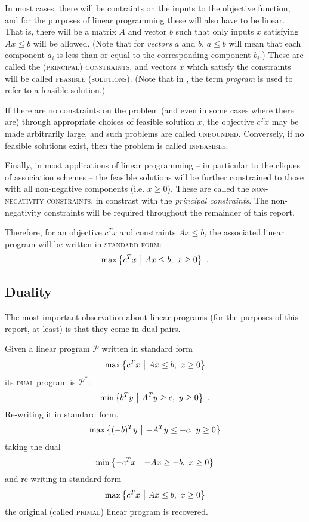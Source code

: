 \documentclass{report}
\begin{document}
    In most cases, there will be contraints on the inputs to the objective
    function, and for the purposes of linear programming these will also have
    to be linear.
    That is, there will be a matrix $A$ and vector $b$
    such that only inputs $x$ satisfying $Ax \leq b$ will be allowed.
    (Note that for \textit{vectors} $a$ and $b$,
    $a \leq b$ will mean that each component $a_i$
    is less than or equal to the corresponding component $b_i$.)
    These are called the \textsc{(principal) constraints},
    and vectors $x$ which satisfy the constraints will be called
    \textsc{feasible (solutions)}.
    (Note that in \cite{delsarte}, the term \textit{program}
    is used to refer to a feasible solution.)

    If there are no constraints on the problem
    (and even in some cases where there are)
    through appropriate choices of feasible solution $x$,
    the objective $c^Tx$ may be made arbitrarily large,
    and such problems are called \textsc{unbounded}.
    Conversely, if no feasible solutions exist,
    then the problem is called \textsc{infeasible}.

    Finally, in most applications of linear programming --
    in particular to the cliques of association schemes --
    the feasible solutions will be further constrained
    to those with all non-negative components (i.e. $x \geq 0$).
    These are called the \textsc{non-negativity constraints},
    in constrast with the \textit{principal constraints}.
    The non-negativity constraints will be required throughout the remainder of
    this report.

    Therefore, for an objective $c^T x$ and constraints $Ax \leq b$,
    the associated linear program will be written in \textsc{standard form}:
    $$
      \max\left\lbrace  
        c^T x
       \ \middle| \ 
        A x \leq b,\
        x \geq 0
        \right\rbrace
      \ .
    $$

    \subsection{Duality}

      The most important observation about linear programs
      (for the purposes of this report, at least)
      is that they come in dual pairs.

      Given a linear program $\mathcal{P}$ written in standard form
      $$
        \max\left\lbrace  
          c^T x
         \ \middle| \ 
          A x \leq b,\
          x \geq 0
          \right\rbrace
      $$
      its \textsc{dual} program is $\mathcal{P}^*$:
      $$
        \min\left\lbrace  
          b^T y
         \ \middle| \ 
          A^T y \geq c,\
          y \geq 0
          \right\rbrace
        \ .
      $$
      Re-writing it in standard form,
      $$
        \max\left\lbrace  
          (-b)^T y
         \ \middle| \ 
          -A^T y \leq -c,\
          y \geq 0
          \right\rbrace
      $$
      taking the dual
      $$
        \min\left\lbrace  
          -c^T x
         \ \middle| \ 
          -A x \geq -b,\
          x \geq 0
          \right\rbrace
      $$
      and re-writing in standard form
      $$
        \max\left\lbrace  
          c^T x
         \ \middle| \ 
          A x \leq b,\
          x \geq 0
          \right\rbrace
      $$
      the original (called \textsc{primal}) linear program is recovered.
\end{document}
